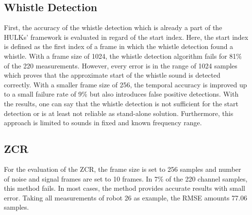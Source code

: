\subsection{Whistle Detection}
\label{subsec:04_whistleDetection}

First, the accuracy of the whistle detection which is already a part of the HULKs' framework
is evaluated in regard of the start index.
Here, the start index is defined as the first index of a frame in which the whistle detection
found a whistle.
With a frame size of 1024, the whistle detection algorithm fails for 81\si{\percent}
of the 220 measurements.
However, every error is in the range of 1024 samples which proves that the
approximate start of the whistle sound is detected correctly.
With a smaller frame size of 256, the temporal accuracy is improved up to a small
failure rate of 9\si{\percent} but also introduces false positive detections.
With the results, one can say that the whistle detection is not sufficient
for the start detection or is at least not reliable as stand-alone solution.
Furthermore, this approach is limited to sounds in fixed and known frequency range.


\subsection{ZCR}
\label{subsec:04_zcr}

For the evaluation of the \ac{ZCR},
the frame size is set to 256 samples and number of noise and signal frames
are set to 10 frames.
In 7\si{\percent} of the 220 channel samples, this method fails.
In most cases, the method provides accurate results with
small error. Taking all measurements of robot 26 as example, the \ac{RMSE}
amounts 77.06 samples.

